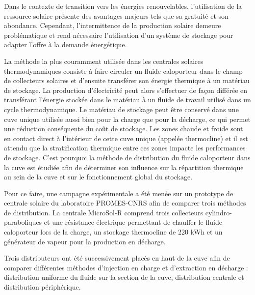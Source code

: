 {\small
Dans le contexte de transition vers les énergies renouvelables, l'utilisation de la ressource solaire présente des avantages majeurs tels que sa gratuité et son abondance. Cependant, l'intermittence de la production solaire demeure problématique et rend nécessaire l'utilisation d'un système de stockage pour adapter l'offre à la demande énergétique. 







La méthode la plus couramment utilisée dans les centrales solaires thermodynamiques consiste à faire circuler un fluide caloporteur dans le champ de collecteurs solaires et d'ensuite transférer son énergie thermique à un matériau de stockage. La production d'électricité peut alors s'effectuer de façon différée en transférant l'énergie stockée dans le matériau à un fluide de travail utilisé dans un cycle thermodynamique. Le matériau de stockage peut être conservé dans une cuve unique utilisée aussi bien pour la charge que pour la décharge, ce qui permet une réduction conséquente du coût de stockage. Les zones chaude et froide sont en contact direct à l'intérieur de cette cuve unique (appelée thermocline) et il est attendu que la stratification thermique entre ces zones impacte les performances de stockage. C'est pourquoi la méthode de distribution du fluide caloporteur dans la cuve est étudiée afin de déterminer son influence sur la répartition thermique au sein de la cuve et sur le fonctionnement global du stockage. 







Pour ce faire, une campagne expérimentale a été menée sur un prototype de centrale solaire du laboratoire PROMES-CNRS afin de comparer trois méthodes de distribution. La centrale MicroSol-R comprend trois collecteurs cylindro-paraboliques et une résistance électrique permettant de chauffer le fluide caloporteur lors de la charge, un stockage thermocline de 220 kWh et un générateur de vapeur pour la production en décharge. 







Trois distributeurs ont été successivement placés en haut de la cuve afin de comparer différentes méthodes d'injection en charge et d'extraction en décharge : distribution uniforme du fluide sur la section de la cuve, distribution centrale et distribution périphérique. 







}
